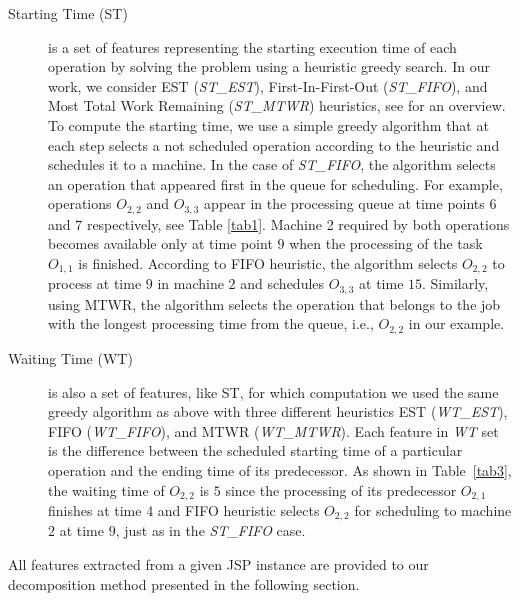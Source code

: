 \documentclass[runningheads]{llncs}
\newcommand{\stest}{\textit{ST\_EST}\xspace}
\newcommand{\stmtwr}{\textit{ST\_MTWR}\xspace}
\newcommand{\stfifo}{\textit{ST\_FIFO}\xspace}
\newcommand{\wtest}{\textit{WT\_EST}\xspace}
\newcommand{\wtmtwr}{\textit{WT\_MTWR}\xspace}
\newcommand{\wtfifo}{\textit{WT\_FIFO}\xspace}
\begin{document}
\begin{description}
  \item[Starting Time (ST)] is a set of features representing the starting execution time of each operation by solving the problem using a heuristic greedy search. In our work, we consider EST (\stest), First-In-First-Out (\stfifo), and Most Total Work Remaining (\stmtwr) heuristics, see \cite{jones1998survey} for an overview.
  To compute the starting time, we use a simple greedy algorithm \cite{el2020job} that at each step selects a not scheduled operation according to the heuristic and schedules it to a machine. In the case of \stfifo, the algorithm selects an operation that appeared first in the queue for scheduling. For example, operations $O_{2,2}$ and $O_{3,3}$ appear in the processing queue at time points $6$ and $7$ respectively, see Table \ref{tab1}. Machine 2 required by both operations becomes available only at time point $9$ when the processing of the task $O_{1,1}$ is finished. According to FIFO heuristic, the algorithm selects $O_{2,2}$ to process at time $9$ in machine $2$ and schedules $O_{3,3}$ at time $15$. Similarly, using MTWR, the algorithm selects the operation that belongs to the job with the longest processing time from the queue, i.e., $O_{2,2}$ in our example.

  \item[Waiting Time (WT)] is also a set of features, like ST, for which computation we used the same greedy algorithm as above with three different heuristics EST (\wtest), FIFO (\wtfifo), and MTWR (\wtmtwr). Each feature in \textit{WT} set is the difference between the scheduled starting time of a particular operation and the ending time of its predecessor.
  As shown in Table~\ref{tab3}, the waiting time of $O_{2,2}$ is $5$ since the processing of its predecessor $O_{2,1}$ finishes at time $4$ and FIFO heuristic selects $O_{2,2}$ for scheduling to machine $2$ at time $9$, just as in the \stfifo case.
\end{description}
%
All features extracted from a given JSP instance are provided to our decomposition method presented in the following section. 
\end{document}
